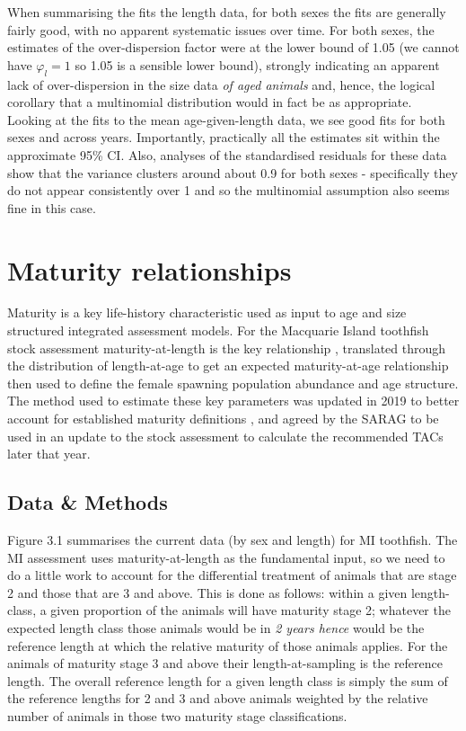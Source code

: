 \documentclass[12pt,a4paper,twoside,times,blue,standard]{csiroreport2017}
\newcommand{\vphi}{\varphi}
\begin{document}
When summarising the fits the length data, for both sexes the fits are generally fairly good, with no apparent systematic issues over time. For both sexes, the estimates of the over-dispersion factor were at the lower bound of 1.05 (we cannot have $\vphi_l=1$ so 1.05 is a sensible lower bound), strongly indicating an apparent lack of over-dispersion in the size data \emph{of aged animals} and, hence, the logical corollary that a multinomial distribution would in fact be as appropriate. Looking at the fits to the mean age-given-length data, we see good fits for both sexes and across years. Importantly, practically all the estimates sit within the approximate 95\% CI. Also, analyses of the standardised residuals for these data show that the variance clusters around about 0.9 for both sexes - specifically they do not appear consistently over 1 and so the multinomial assumption also seems fine in this case.

\section{Maturity relationships}

Maturity is a key life-history characteristic used as input to age and size structured integrated assessment models. For the Macquarie Island toothfish stock assessment maturity-at-length is the key relationship \cite{revass2019}, translated through the distribution of length-at-age to get an expected maturity-at-age relationship then used to define the female spawning population abundance and age structure. The method used to estimate these key parameters was updated in 2019 \cite{mimat} to better account for established maturity definitions \cite{matref}, and agreed by the SARAG to be used in an update to the stock assessment to calculate the recommended TACs later that year. 

\subsection{Data \& Methods}

Figure 3.1 summarises the current data (by sex and length) for MI toothfish. The MI assessment uses maturity-at-length as the fundamental input, so we need to do a little work to account for the differential treatment of animals that are stage 2 and those that are 3 and above. This is done as follows: within a given length-class, a given proportion of the animals will have maturity stage 2; whatever the expected length class those animals would be in \emph{2 years hence} would be the reference length at which the relative maturity of those animals applies. For the animals of maturity stage 3 and above their length-at-sampling is the reference length. The overall reference length for a given length class is simply the sum of the reference lengths for 2 and 3 and above animals weighted by the relative number of animals in those two maturity stage classifications.
\end{document}
